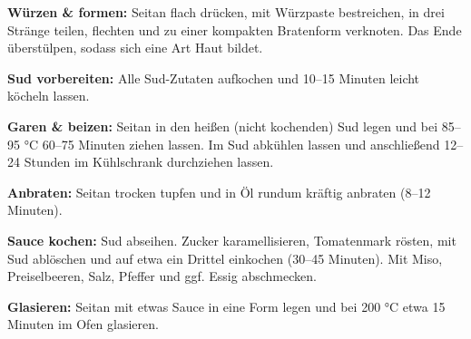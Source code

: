 \begin{recipe}
{    \step%
    \textbf{Würzen \& formen:} Seitan flach drücken, mit Würzpaste bestreichen, in drei Stränge teilen, flechten und zu einer kompakten Bratenform verknoten. 
    Das Ende überstülpen, sodass sich eine Art Haut bildet.
    
    \step%
    \textbf{Sud vorbereiten:} Alle Sud-Zutaten aufkochen und 10--15 Minuten leicht köcheln lassen.
    
    \step%
    \textbf{Garen \& beizen:} Seitan in den heißen (nicht kochenden) Sud legen und bei 85--95 °C 60--75 Minuten ziehen lassen. 
    Im Sud abkühlen lassen und anschließend 12--24 Stunden im Kühlschrank durchziehen lassen.
    
    \step%
    \textbf{Anbraten:} Seitan trocken tupfen und in Öl rundum kräftig anbraten (8--12 Minuten).
    
    \step%
    \textbf{Sauce kochen:} Sud abseihen. Zucker karamellisieren, Tomatenmark rösten, mit Sud ablöschen und auf etwa ein Drittel einkochen (30--45 Minuten). 
    Mit Miso, Preiselbeeren, Salz, Pfeffer und ggf. Essig abschmecken.
    
    \step%
    \textbf{Glasieren:} Seitan mit etwas Sauce in eine Form legen und bei 200 °C etwa 15 Minuten im Ofen glasieren.
}




\end{recipe}